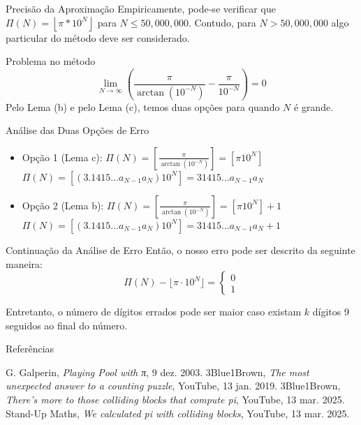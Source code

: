 \documentclass{beamer}
\begin{document}
\begin{frame}{Precisão da Aproximação}
  Empiricamente, pode-se verificar que $\Pi(N) = \left\lfloor\pi*10^N\right\rfloor$ para $N \le 50,000,000$. Contudo, para $N > 50,000,000$ algo particular do método deve ser considerado.
\end{frame}

\begin{frame}{Problema no método}
  $$
  \lim_{N\to\infty}\left(\frac{\pi}{\arctan(10^{-N})}-\frac{\pi}{10^{-N}}\right)=0
  $$
  Pelo Lema (b) e pelo Lema (c), temos duas opções para quando $N$ é grande.
\end{frame}

\begin{frame}{Análise das Duas Opções de Erro}
  \begin{itemize}
    \item Opção 1 (Lema c): $\Pi(N) = \left [ \frac{\pi}{\arctan{(10^{-N})}}\right] = [\pi 10^N]$
       $\Pi(N) = [(3.1415\dots a_{N-1} a_{N})10^N]=31415\dots a_{N-1}a_N$
    \item Opção 2 (Lema b): $\Pi(N) = \left [ \frac{\pi}{\arctan{(10^{-N})}}\right] = [\pi 10^N]+1$
       $\Pi(N) =[(3.1415\dots a_{N-1} a_{N})10^N]=31415\dots a_{N-1}a_N+1$
  \end{itemize}
\end{frame}

\begin{frame}{Continuação da Análise de Erro}
  Então, o nosso erro pode ser descrito da seguinte maneira:
    \begin{equation*}
        \Pi(N) - \lfloor \pi \cdot 10^N \rfloor = \left\{
        \begin{array}{c}
        0 \\
        1
        \end{array}
        \right.
    \end{equation*}

Entretanto, o número de dígitos errados pode ser maior caso existam $k$ dígitos 9 seguidos ao final do número.
\end{frame}
\begin{frame}[allowframebreaks]{Referências}
  \begin{thebibliography}{}
     G. Galperin, \emph{Playing Pool with π}, 9 dez. 2003.
     3Blue1Brown, \emph{The most unexpected answer to a counting puzzle}, YouTube, 13 jan. 2019.
     3Blue1Brown, \emph{There's more to those colliding blocks that compute pi}, YouTube, 13 mar. 2025.
     Stand-Up Maths, \emph{We calculated pi with colliding blocks}, YouTube, 13 mar. 2025.
  \end{thebibliography}
\end{frame}
\end{document}
